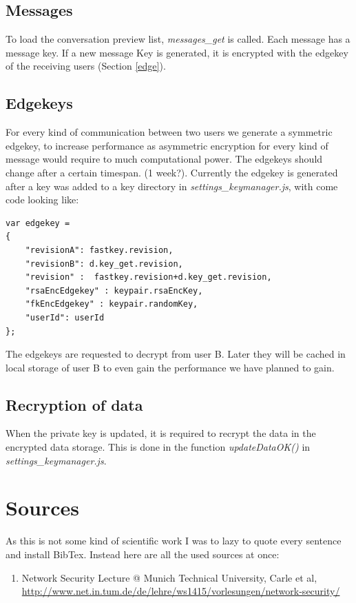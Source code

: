 \documentclass{scrartcl}
\begin{document}
\subsection{Messages}
To load the conversation preview list, \textit{messages\_get} is called. Each message has a message key. If a new message Key is generated, it is encrypted with the edgekey of the receiving users (Section \ref{edge}).

\subsection{Edgekeys\label{edge}}
For every kind of communication between two users we generate a symmetric edgekey, to increase performance as asymmetric encryption for every kind of message would require to much computational power.
The edgekeys should change after a certain timespan. (1 week?). Currently the edgekey is generated after a key was added to a key directory in \textit{settings\_keymanager.js}, with come code looking like:
\begin{lstlisting}
var edgekey = 
{
	"revisionA": fastkey.revision,
	"revisionB": d.key_get.revision,
	"revision" :  fastkey.revision+d.key_get.revision,
	"rsaEncEdgekey" : keypair.rsaEncKey,
	"fkEncEdgekey" : keypair.randomKey,
	"userId": userId
};
\end{lstlisting}
The edgekeys are requested to decrypt from user B. Later they will be cached in local storage of user B to even gain the performance we have planned to gain.
\subsection{Recryption of data}
When the private key is updated, it is required to recrypt the data in the encrypted data storage. This is done in the function \textit{updateDataOK()} in \textit{settings\_keymanager.js}.


\section{Sources}
As this is not some kind of scientific work I was to lazy to quote every sentence and install BibTex. Instead here are all the used sources at once: 
\begin{enumerate}
\item Network Security Lecture @ Munich Technical University, Carle et al,  \url{http://www.net.in.tum.de/de/lehre/ws1415/vorlesungen/network-security/}
\end{enumerate}
  
\end{document}
